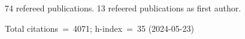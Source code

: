 74 refereed publications. 13 refeered publications as first author.

Total citations~=~4071; h-index~=~35 (2024-05-23)